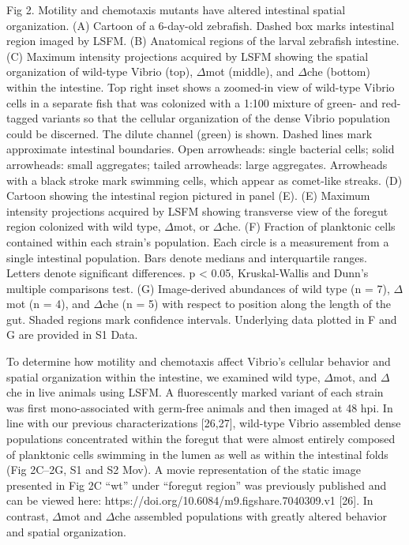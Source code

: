 Fig 2. Motility and chemotaxis mutants have altered intestinal spatial organization. 
(A) Cartoon of a 6-day-old zebrafish. Dashed box marks intestinal region imaged by LSFM. (B) Anatomical regions of the larval zebrafish intestine. (C) Maximum intensity projections acquired by LSFM showing the spatial organization of wild-type Vibrio (top), $\Delta$mot (middle), and $\Delta$che (bottom) within the intestine. Top right inset shows a zoomed-in view of wild-type Vibrio cells in a separate fish that was colonized with a 1:100 mixture of green- and red-tagged variants so that the cellular organization of the dense Vibrio population could be discerned. The dilute channel (green) is shown. Dashed lines mark approximate intestinal boundaries. Open arrowheads: single bacterial cells; solid arrowheads: small aggregates; tailed arrowheads: large aggregates. Arrowheads with a black stroke mark swimming cells, which appear as comet-like streaks. (D) Cartoon showing the intestinal region pictured in panel (E). (E) Maximum intensity projections acquired by LSFM showing transverse view of the foregut region colonized with wild type, $\Delta$mot, or $\Delta$che. (F) Fraction of planktonic cells contained within each strain's population. Each circle is a measurement from a single intestinal population. Bars denote medians and interquartile ranges. Letters denote significant differences. p < 0.05, Kruskal-Wallis and Dunn's multiple comparisons test. (G) Image-derived abundances of wild type (n = 7), $\Delta$mot (n = 4), and $\Delta$che (n = 5) with respect to position along the length of the gut. Shaded regions mark confidence intervals. Underlying data plotted in F and G are provided in S1 Data.

To determine how motility and chemotaxis affect Vibrio's cellular behavior and spatial organization within the intestine, we examined wild type, $\Delta$mot, and $\Delta$che in live animals using LSFM. A fluorescently marked variant of each strain was first mono-associated with germ-free animals and then imaged at 48 hpi. In line with our previous characterizations [26,27], wild-type Vibrio assembled dense populations concentrated within the foregut that were almost entirely composed of planktonic cells swimming in the lumen as well as within the intestinal folds (Fig 2C–2G, S1 and S2 Mov). A movie representation of the static image presented in Fig 2C ``wt'' under ``foregut region'' was previously published and can be viewed here: https://doi.org/10.6084/m9.figshare.7040309.v1 [26]. In contrast, $\Delta$mot and $\Delta$che assembled populations with greatly altered behavior and spatial organization. 

